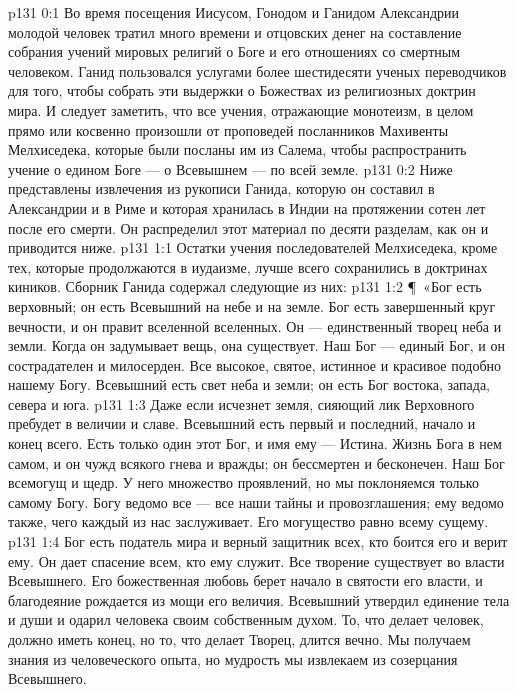 \author{Комиссия срединников}
\vs p131 0:1 Во время посещения Иисусом, Гонодом и Ганидом Александрии молодой человек тратил много времени и отцовских денег на составление собрания учений мировых религий о Боге и его отношениях со смертным человеком. Ганид пользовался услугами более шестидесяти ученых переводчиков для того, чтобы собрать эти выдержки о Божествах из религиозных доктрин мира. И следует заметить, что все учения, отражающие монотеизм, в целом прямо или косвенно произошли от проповедей посланников Махивенты Мелхиседека, которые были посланы им из Салема, чтобы распространить учение о едином Боге --- о Всевышнем --- по всей земле.
\vs p131 0:2 Ниже представлены извлечения из рукописи Ганида, которую он составил в Александрии и в Риме и которая хранилась в Индии на протяжении сотен лет после его смерти. Он распределил этот материал по десяти разделам, как он и приводится ниже.
\vs p131 1:1 Остатки учения последователей Мелхиседека, кроме тех, которые продолжаются в иудаизме, лучше всего сохранились в доктринах киников. Сборник Ганида содержал следующие из них:
\vs p131 1:2 \P\ «Бог есть верховный; он есть Всевышний на небе и на земле. Бог есть завершенный круг вечности, и он правит вселенной вселенных. Он --- единственный творец неба и земли. Когда он задумывает вещь, она существует. Наш Бог --- единый Бог, и он сострадателен и милосерден. Все высокое, святое, истинное и красивое подобно нашему Богу. Всевышний есть свет неба и земли; он есть Бог востока, запада, севера и юга.
\vs p131 1:3 Даже если исчезнет земля, сияющий лик Верховного пребудет в величии и славе. Всевышний есть первый и последний, начало и конец всего. Есть только один этот Бог, и имя ему --- Истина. Жизнь Бога в нем самом, и он чужд всякого гнева и вражды; он бессмертен и бесконечен. Наш Бог всемогущ и щедр. У него множество проявлений, но мы поклоняемся только самому Богу. Богу ведомо все --- все наши тайны и провозглашения; ему ведомо также, чего каждый из нас заслуживает. Его могущество равно всему сущему.
\vs p131 1:4 Бог есть податель мира и верный защитник всех, кто боится его и верит ему. Он дает спасение всем, кто ему служит. Все творение существует во власти Всевышнего. Его божественная любовь берет начало в святости его власти, и благодеяние рождается из мощи его величия. Всевышний утвердил единение тела и души и одарил человека своим собственным духом. То, что делает человек, должно иметь конец, но то, что делает Творец, длится вечно. Мы получаем знания из человеческого опыта, но мудрость мы извлекаем из созерцания Всевышнего.
